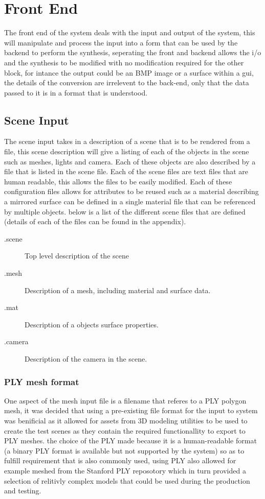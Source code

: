 \section{Front End}
The front end of the system deals with the input and output of the system, this will manipulate and process
the input into a form that can be used by the backend to perform the synthesis, seperating the front and backend
allows the i/o and the synthesis to be modified with no modification required for the other block,
for intance the output could be an BMP image or a surface within a gui, the details of the conversion are
irrelevent to the back-end, only that the data passed to it is in a format that is understood.

\subsection{Scene Input}
The scene input takes in a description of a scene that is to be rendered from a file, this scene description
will give a listing of each of the objects in the scene such as meshes, lights and camera. Each of these
objects are also described by a file that is listed in the scene file. Each of the scene files are text files
that are human readable, this allows the files to be easily modified. Each of these configuration files allows
for attributes to be reused such as a material describing a mirrored surface can be defined in a single material
file that can be referenced by multiple objects. below is a list of the different scene files that are defined
(details of each of the files can be found in the appendix).

\begin{description}
\item[.scene] Top level description of the scene
\item[.mesh] Description of a mesh, including material and surface data.
\item[.mat] Description of a objects surface properties.
\item[.camera] Description of the camera in the scene.
\end{description}

\subsubsection{PLY mesh format}
One aspect of the mesh input file is a filename that referes to a PLY polygon mesh, it was decided that using
a pre-existing file format for the input to system was benificial as it allowed for assets from 3D modeling
utilities to be used to create the test scenes as they contain the required functionallity to export to PLY
meshes. the choice of the PLY made because it is a human-readable format (a binary PLY format is available but
not supported by the system) so as to fulfill requirement  that is also commonly used,
using PLY also allowed for example meshed from the Stanford PLY reposotory which in turn provided a selection of
relitivly complex models that could be used during the production and testing.

